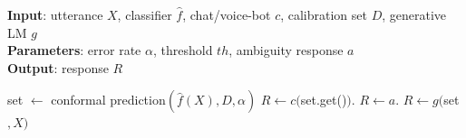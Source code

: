 \begin{algorithm}[tb]
\caption{CICC algorithm}
\label{alg:cicc}
\begin{flushleft}
\textbf{Input}: utterance $X$, classifier $\hat{f}$, chat/voice-bot $c$, calibration set $D$, generative LM $g$ \\
\textbf{Parameters}: error rate $\alpha$, threshold $th$, ambiguity response $a$         \\
\textbf{Output}: response $R$
\end{flushleft}
\begin{algorithmic}[1] %
\STATE set $\gets$ conformal prediction$\left(\hat{f}(X), D, \alpha\right)$
\STATE $R \gets c($set.get()$)$.  \hfill {}
\STATE $R \gets a$. \hfill {}
\ELSE
\STATE $R \gets g($set$, X)$ \hfill{}
\ENDIF  
\end{algorithmic}
\end{algorithm}
